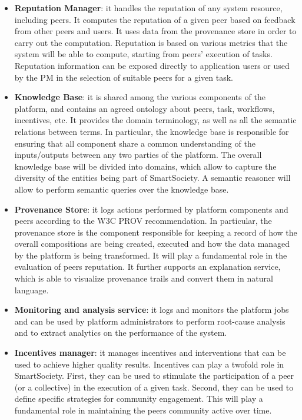 \begin{itemize}
\item \textbf{Reputation Manager}: it handles the reputation of any system resource, including peers. It computes the reputation of a given peer based on feedback from other peers and users. It uses data from the provenance store in order to carry out the computation. Reputation is based on various metrics that the system will be able to compute, starting from peers' execution of tasks. Reputation information can be exposed directly to application users or used by the PM in the selection of suitable peers for a given task.

\item \textbf{Knowledge Base}: it is shared among the various components of the platform, and contains an agreed ontology about peers, task, workflows, incentives, etc. It provides the domain terminology, as well as all the semantic relations between terms. In particular, the knowledge base is responsible for ensuring that all component share a common understanding of the inputs/outputs between any two parties of the platform. The overall knowledge base will be divided into domains, which allow to capture the diversity of the entities being part of SmartSociety. A semantic reasoner will allow to perform semantic queries over the knowledge base.

\item \textbf{Provenance Store}: it logs actions performed by platform
components and peers according to the W3C PROV recommendation. In particular, the provenance store is the component responsible for keeping a record of how the overall compositions are being created, executed and how the data managed by the platform is being transformed. It will play a fundamental role in the evaluation of peers reputation. %
It further supports an explanation service, which is able to visualize provenance trails and convert them in natural language.

\item {\bf Monitoring and analysis service}: it logs and monitors the platform jobs and can be used by platform administrators to perform root-cause analysis and to extract analytics on the performance of the system. 

\item {\bf Incentives manager}: it manages incentives and
interventions that can be used to achieve higher quality results. Incentives can play a twofold role in SmartSociety. First, they can be used to stimulate the participation of a peer (or a collective) in the execution of a given task. Second, they can be used to define specific strategies for community engagement. This will play a fundamental role in maintaining the peers community active over time.
\end{itemize} 	


